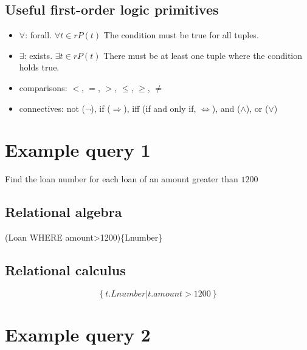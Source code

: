 \documentclass[
  14pt,
]{extarticle}
\providecommand{\tightlist}{%
  \setlength{\itemsep}{0pt}\setlength{\parskip}{0pt}}
\begin{document}
\hypertarget{useful-first-order-logic-primitives}{%
\subsection{Useful first-order logic
primitives}\label{useful-first-order-logic-primitives}}

\begin{itemize}
\tightlist
\item
  \(\forall\): forall. \(\forall t \in r P(t)\) The condition must be
  true for all tuples.
\item
  \(\exists\): exists. \(\exists t \in r P(t)\) There must be at least
  one tuple where the condition holds true.
\item
  comparisons: \(<\), \(=\), \(>\), \(\leq\), \(\geq\), \(\neq\)
\item
  connectives: not (\(\neg\)), if (\(\Rightarrow\)), iff (if and only
  if, \(\iff\)), and (\(\land\)), or (\(\lor\))
\end{itemize}

\newpage

\hypertarget{example-query-1}{%
\section{Example query 1}\label{example-query-1}}

Find the loan number for each loan of an amount greater than \(1200\)

\hypertarget{relational-algebra-1}{%
\subsection{Relational algebra}\label{relational-algebra-1}}

(Loan WHERE amount\textgreater1200)\{Lnumber\}

\vspace{7cm}

\hypertarget{relational-calculus-1}{%
\subsection{Relational calculus}\label{relational-calculus-1}}

\begin{equation*}
\left\{ t.Lnumber | t.amount > 1200 \right\}
\end{equation*}

\newpage

\hypertarget{example-query-2}{%
\section{Example query 2}\label{example-query-2}}
\end{document}
